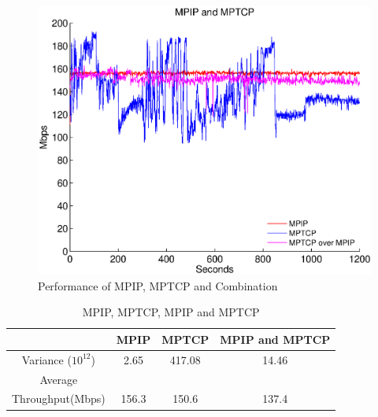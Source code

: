 \begin{figure}
\centering
\includegraphics[width=1\linewidth]{fig/mpip_mptcp.eps}
\caption{Performance of MPIP, MPTCP and Combination}
\label{fig.mpip_mptcp}
\end{figure}

\begin{table}[htbp]
\caption{\label{tb.stat}MPIP, MPTCP, MPIP and MPTCP}
\centering
\begin{tabular}{|c|c|c|c|}
\hline
 & MPIP & MPTCP & MPIP and MPTCP\\
\hline
Variance (${10}^{12}$) & 2.65 & 417.08 & 14.46 \\
\hline
Average &&&\\
Throughput(Mbps) & 156.3 & 150.6 & 137.4  \\
\hline
\end{tabular}
\end{table}

%
%
